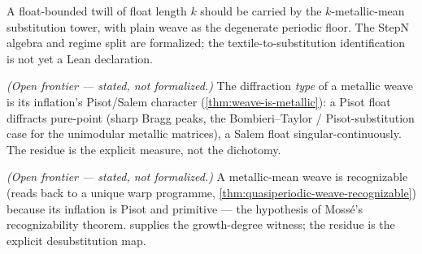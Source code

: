 \begin{theorem}\label{thm:weave-is-metallic}\notready{}
A float-bounded twill of float length \(k\) should be carried by the
\(k\)-metallic-mean substitution tower, with plain weave as the degenerate
periodic floor.  The StepN algebra and regime split are formalized; the
textile-to-substitution identification is not yet a Lean declaration.
\end{theorem}

\begin{theorem}\label{thm:weave-diffraction-pisot}\notready{}
\emph{(Open frontier --- stated, not formalized.)} The diffraction \emph{type} of a metallic
weave is its inflation's Pisot/Salem character (\cref{thm:weave-is-metallic}): a Pisot float
diffracts pure-point (sharp Bragg peaks, the Bombieri--Taylor / Pisot-substitution case for the
unimodular metallic matrices), a Salem float singular-continuously.  The residue is
the explicit measure, not the dichotomy.
\end{theorem}

\begin{theorem}\label{thm:metallic-weave-recognizable-mosse}\notready{}
\emph{(Open frontier --- stated, not formalized.)} A metallic-mean weave is recognizable
(reads back to a unique warp programme, \cref{thm:quasiperiodic-weave-recognizable}) because its
inflation is Pisot and primitive --- the hypothesis of Moss\'e's recognizability theorem.
 supplies the growth-degree witness; the residue is
the explicit desubstitution map.
\end{theorem}
